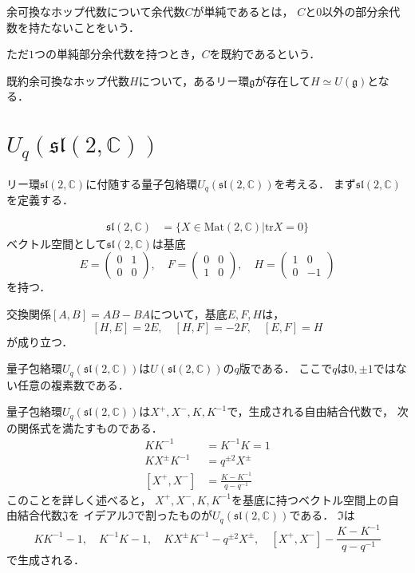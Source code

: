 \documentclass[10pt,dvipdfm]{beamer}
\newcommand{\CC}{\mathbb{C}}
\begin{document}
  \begin{frame}
    余可換なホップ代数について余代数$C$が単純であるとは，
    $C$と$0$以外の部分余代数を持たないことをいう．

    ただ$1$つの単純部分余代数を持つとき，$C$を既約であるという．
    \begin{theorem}
      既約余可換なホップ代数$H$について，あるリー環$\mathfrak{g}$が存在して$H\simeq U(\mathfrak{g})$となる．
    \end{theorem}
  \end{frame}
  \section{$U_q(\mathfrak{sl}(2,\CC))$}
  \begin{frame}
    リー環$\mathfrak{sl}(2,\CC)$に付随する量子包絡環$U_q(\mathfrak{sl}(2,\CC))$を考える．
    まず$\mathfrak{sl}(2,\CC)$を定義する．
    \begin{definition}
      \begin{align*}
        \mathfrak{sl}(2,\CC) &= \{X \in \text{Mat}(2,\CC) | \text{tr} X = 0\}
      \end{align*}
      ベクトル空間として$\mathfrak{sl}(2,\CC)$は基底
      \[
      E=\begin{pmatrix} 0 & 1 \\ 0 & 0 \end{pmatrix},\quad F=\begin{pmatrix} 0 & 0 \\ 1 & 0 \end{pmatrix},\quad H=\begin{pmatrix} 1 & 0 \\ 0 & -1 \end{pmatrix}
      \]
      を持つ．
    \end{definition}
    交換関係$[A,B]=AB-BA$について，基底$E,F,H$は，
    \[
    [H,E]=2E,\quad [H,F]=-2F,\quad [E,F]=H
    \]
    が成り立つ．
  \end{frame}
  \begin{frame}
    量子包絡環$U_q(\mathfrak{sl}(2,\CC))$は$U(\mathfrak{sl}(2,\CC))$の$q$版である．
    ここで$q$は$0,\pm1$ではない任意の複素数である．

    量子包絡環$U_q(\mathfrak{sl}(2,\CC))$は$X^+,X^-,K,K^{-1}$で，生成される自由結合代数で，
    次の関係式を満たすものである．
    \begin{align*}
      KK^{-1} &= K^{-1}K = 1\\
      KX^{\pm}K^{-1} &= q^{\pm2}X^{\pm}\\
      [X^+,X^-] &= \frac{K-K^{-1}}{q-q^{-1}}
    \end{align*}
    このことを詳しく述べると，
    $X^+,X^-,K,K^{-1}$を基底に持つベクトル空間上の自由結合代数$\mathfrak{J}$を
    イデアル$\mathfrak{I}$で割ったものが$U_q(\mathfrak{sl}(2,\CC))$である．
    $\mathfrak{I}$は
    \[
    KK^{-1}-1,\quad K^{-1}K-1,\quad KX^{\pm}K^{-1}-q^{\pm2}X^{\pm},\quad [X^+,X^-]-\frac{K-K^{-1}}{q-q^{-1}}
    \]
    で生成される．
  \end{frame}
\end{document}
